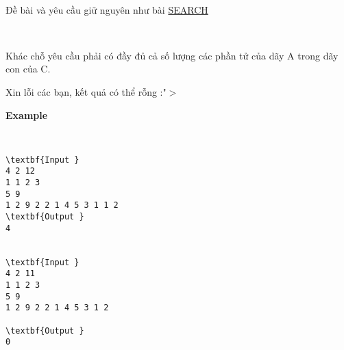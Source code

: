 

 

Đề bài và yêu cầu giữ nguyên như bài \href{http://vnoi.info/problems/show/SEARCH/}{SEARCH}

 

Khác chỗ yêu cầu phải có đầy đủ cả số lượng các phần tử của dãy A trong dãy con của C.

Xin lỗi các bạn, kết quả có thể rỗng :"$>$

\textbf{Example }

 
\begin{verbatim}
\textbf{Input }
4 2 12
1 1 2 3
5 9
1 2 9 2 2 1 4 5 3 1 1 2
\textbf{Output }
4


\textbf{Input }
4 2 11
1 1 2 3
5 9
1 2 9 2 2 1 4 5 3 1 2

\textbf{Output }
0\end{verbatim}